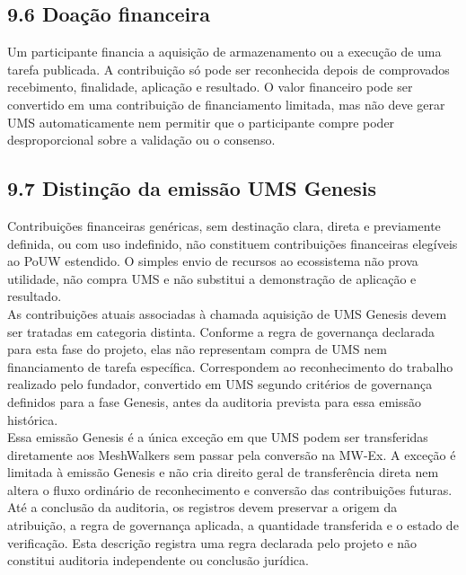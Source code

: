 \documentclass[12pt,a4paper]{article}
\begin{document}
\subsection{9.6 Doação financeira}

Um participante financia a aquisição de armazenamento ou a execução de uma tarefa publicada. A contribuição só pode ser reconhecida depois de comprovados recebimento, finalidade, aplicação e resultado. O valor financeiro pode ser convertido em uma contribuição de financiamento limitada, mas não deve gerar UMS automaticamente nem permitir que o participante compre poder desproporcional sobre a validação ou o consenso.\\

\subsection{9.7 Distinção da emissão UMS Genesis}

Contribuições financeiras genéricas, sem destinação clara, direta e previamente definida, ou com uso indefinido, não constituem contribuições financeiras elegíveis ao PoUW estendido. O simples envio de recursos ao ecossistema não prova utilidade, não compra UMS e não substitui a demonstração de aplicação e resultado.\\

As contribuições atuais associadas à chamada aquisição de UMS Genesis devem ser tratadas em categoria distinta. Conforme a regra de governança declarada para esta fase do projeto, elas não representam compra de UMS nem financiamento de tarefa específica. Correspondem ao reconhecimento do trabalho realizado pelo fundador, convertido em UMS segundo critérios de governança definidos para a fase Genesis, antes da auditoria prevista para essa emissão histórica.\\

Essa emissão Genesis é a única exceção em que UMS podem ser transferidas diretamente aos MeshWalkers sem passar pela conversão na MW-Ex. A exceção é limitada à emissão Genesis e não cria direito geral de transferência direta nem altera o fluxo ordinário de reconhecimento e conversão das contribuições futuras. Até a conclusão da auditoria, os registros devem preservar a origem da atribuição, a regra de governança aplicada, a quantidade transferida e o estado de verificação. Esta descrição registra uma regra declarada pelo projeto e não constitui auditoria independente ou conclusão jurídica.\\
\end{document}
